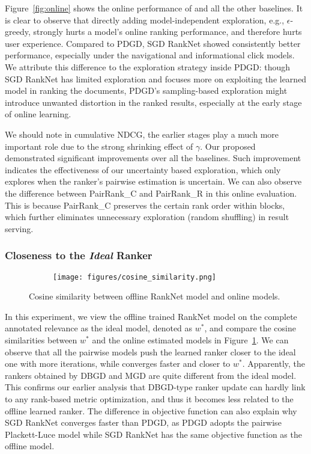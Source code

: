 Figure~\ref{fig:online} shows the online performance of \model{} and all the other baselines. It is clear to observe that directly adding model-independent exploration, e.g., $\epsilon$-greedy, strongly hurts a model's online ranking performance, and therefore hurts user experience. 
Compared to PDGD, SGD RankNet showed consistently better performance, especially under the navigational and informational click models. We attribute this difference to the exploration strategy inside PDGD: though SGD RankNet has limited exploration and focuses more on exploiting the learned model in ranking the documents, PDGD's sampling-based exploration might introduce unwanted distortion in the ranked results, especially at the early stage of online learning. 

We should note in cumulative NDCG, the earlier stages play a much more important role due to the strong shrinking effect of $\gamma$. Our proposed \model{} demonstrated significant improvements over all the baselines.
Such improvement indicates the effectiveness of our uncertainty based exploration, which only explores when the ranker's pairwise estimation is uncertain. 
We can also observe the difference between PairRank\_C and PairRank\_R in this online evaluation. This is because PairRank\_C preserves the certain rank order within blocks, which further eliminates unnecessary exploration (random shuffling) in result serving.

\subsubsection{Closeness to the \emph{Ideal} Ranker}


\begin{figure}[t]
    \centering
    \begin{subfigure}[b]{0.5\textwidth}
    \texttt{[image: figures/cosine\_similarity.png]}
    \end{subfigure}
    \vspace{-4mm}
    \caption{Cosine similarity between offline RankNet model and online models.}
    \label{fig:cosine}
    \vspace{-4mm}
\end{figure}


In this experiment, we view the offline trained RankNet model on the complete annotated relevance as the ideal model, denoted as $w^*$, and compare the cosine similarities between $w^*$ and the online estimated models in Figure~\ref{fig:cosine}. We can observe that all the pairwise models push the learned ranker closer to the ideal one with more iterations, while \model{} converges faster and closer to $w^*$. Apparently, the rankers obtained by DBGD and MGD are quite different from the ideal model. This confirms our earlier analysis that DBGD-type ranker update can hardly link to any rank-based metric optimization, and thus it becomes less related to the offline learned ranker.  
The difference in objective function can also explain why SGD RankNet converges faster than PDGD, as PDGD adopts the pairwise Plackett-Luce model while SGD RankNet has the same objective function as the offline model.

